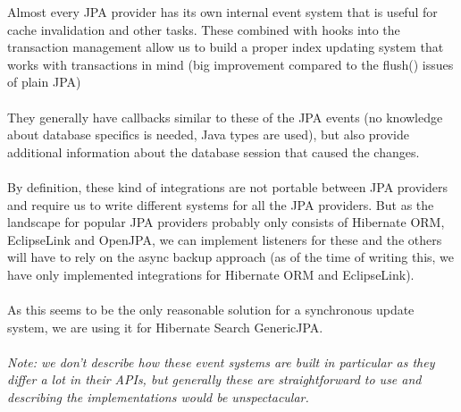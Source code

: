 Almost every JPA provider has its own internal event system that is useful for cache invalidation and other tasks. These combined with hooks into the transaction management allow us to build a proper index updating system that works with transactions in mind (big improvement compared to the flush() issues of plain JPA)
\\\\
They generally have callbacks similar to these of the JPA events (no knowledge about database specifics is needed, Java types are used), but also provide additional information about the database session that caused the changes.
\\\\
By definition, these kind of integrations are not portable between JPA providers and require us to write different systems for all the JPA providers. But as the landscape for popular JPA providers probably only consists of Hibernate ORM, EclipseLink and OpenJPA, we can implement listeners for these and the others will have to rely on the async backup approach (as of the time of writing this, we have only implemented integrations for Hibernate ORM and EclipseLink).
\\\\
As this seems to be the only reasonable solution for a synchronous update system, we are using it for Hibernate Search GenericJPA.
\\\\
\textit{Note: we don't describe how these event systems are built in particular as they differ a lot in their APIs, but generally these are straightforward to use and describing the implementations would be unspectacular.}

\pagebreak

